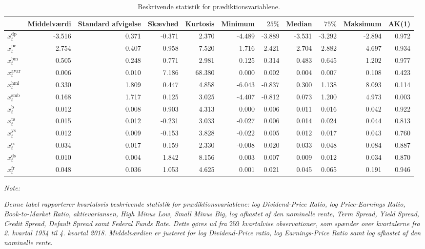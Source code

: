 \documentclass[
  a4paper,
  oneside]{memoir}
\begin{document}
\begin{landscape}
\begin{table}[!h]

\caption{\label{tab:DES-TILSTANDSVARIABLE}Beskrivende statistik for prædiktionsvariablene.}
\centering
\begin{threeparttable}
\begin{tabular}[t]{lrrrrrrrrrr}
\toprule
  & Middelværdi & Standard afvigelse & Skævhed & Kurtosis & Minimum & $25 \%$ & Median & $75 \%$ & Maksimum & AK(1)\\
\midrule
\rowcolor{gray!6}  $x_t^{\text{dp}}$ & -3.516 & 0.371 & -0.371 & 2.370 & -4.489 & -3.889 & -3.531 & -3.292 & -2.894 & 0.972\\
$x_t^{\text{pe}}$ & 2.754 & 0.407 & 0.958 & 7.520 & 1.716 & 2.421 & 2.704 & 2.882 & 4.697 & 0.934\\
\rowcolor{gray!6}  $x_t^{\text{bm}}$ & 0.505 & 0.248 & 0.771 & 2.981 & 0.125 & 0.314 & 0.483 & 0.645 & 1.202 & 0.977\\
$x_t^{\text{avar}}$ & 0.006 & 0.010 & 7.186 & 68.380 & 0.000 & 0.002 & 0.004 & 0.007 & 0.108 & 0.423\\
\rowcolor{gray!6}  $x_t^{\text{hml}}$ & 0.330 & 1.809 & 0.447 & 4.858 & -6.043 & -0.837 & 0.300 & 1.138 & 8.093 & 0.114\\
$x_t^{\text{smb}}$ & 0.168 & 1.717 & 0.125 & 3.025 & -4.407 & -0.812 & 0.073 & 1.200 & 4.973 & 0.003\\
\rowcolor{gray!6}  $x_t^{\text{b}}$ & 0.012 & 0.008 & 0.903 & 4.313 & 0.000 & 0.006 & 0.011 & 0.016 & 0.042 & 0.922\\
$x_t^{\text{ts}}$ & 0.015 & 0.012 & -0.231 & 3.033 & -0.027 & 0.006 & 0.014 & 0.024 & 0.044 & 0.813\\
\rowcolor{gray!6}  $x_t^{\text{ys}}$ & 0.012 & 0.009 & -0.153 & 3.828 & -0.022 & 0.005 & 0.012 & 0.017 & 0.043 & 0.760\\
$x_t^{\text{cs}}$ & 0.034 & 0.017 & 0.159 & 2.330 & -0.008 & 0.020 & 0.033 & 0.048 & 0.084 & 0.887\\
\rowcolor{gray!6}  $x_t^{\text{ds}}$ & 0.010 & 0.004 & 1.842 & 8.156 & 0.003 & 0.007 & 0.009 & 0.012 & 0.034 & 0.870\\
$x_t^{\text{fr}}$ & 0.048 & 0.036 & 1.053 & 4.625 & 0.001 & 0.021 & 0.045 & 0.065 & 0.191 & 0.946\\
\bottomrule
\end{tabular}
\begin{tablenotes}
\item \textit{Note: } 
\item \textit{Denne tabel rapporterer kvartalsvis beskrivende statistik for prædiktionsvariablene: log Dividend-Price Ratio, log Price-Earnings Ratio, Book-to-Market Ratio, aktievariansen, High Minus Low, Small Minus Big, log afkastet af den nominelle rente, Term Spread, Yield Spread, Credit Spread, Default Spread samt Federal Funds Rate. Dette gøres ud fra $259$ kvartalvise observationer, som spænder over kvartalerne fra 2. kvartal 1954 til 4. kvartal 2018. Middelværdien er justeret for log Dividend-Price ratio, log Earnings-Price Ratio samt log afkastet af den nominelle rente.}

\end{tablenotes}
\end{threeparttable}
\end{table}
\end{landscape}
\end{document}
